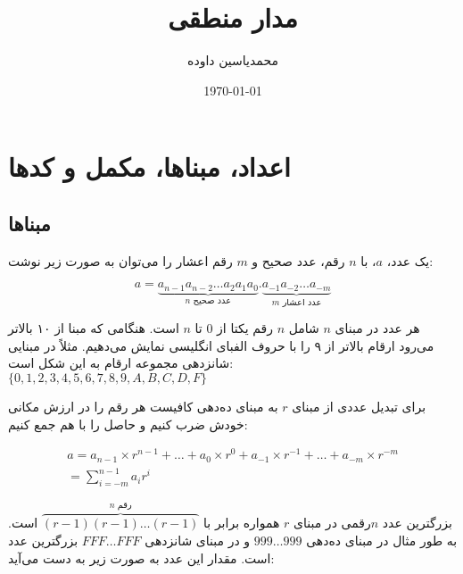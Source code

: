 \documentclass[a5paper]{article}
\author{محمدیاسین داوده}
\title{مدار منطقی}
\date{\today}
\begin{document}
\begin{titlingpage}
\maketitle


\tableofcontents
\end{titlingpage}

\section{اعداد، مبناها، مکمل و کدها}
\subsection{مبناها}
یک عدد، $a$، با $n$ رقم، عدد صحیح و $m$ رقم اعشار را می‌توان به صورت زیر نوشت:

\begin{equation}
  a = \underbrace{a_{n-1}a_{n-2} \ldots a_2a_1a_0}_{\text{$n$ عدد صحیح}}.\underbrace{a_{-1}a_{-2} \ldots a_{-m}}_{\text{$m$ عدد اعشار}}
\end{equation}

هر عدد در مبنای $n$ شامل $n$ رقم یکتا از $0$ تا $n$ است.
هنگامی که مبنا از ۱۰ بالاتر می‌رود ارقام بالاتر از ۹ را با حروف الفبای انگلیسی نمایش می‌دهیم.
مثلاً در مبنایی شانزدهی مجموعه ارقام به این شکل است:\\
$\{0,1,2,3,4,5,6,7,8,9,A,B,C,D,F\}$

برای تبدیل عددی از مبنای $r$ به مبنای ده‌دهی کافیست هر رقم را در
ارزش مکانی خودش ضرب کنیم و حاصل را با هم جمع کنیم:

\begin{equation}\begin{split}
  a = a_{n-1} \times r^{n-1} + \ldots + a_{0} \times r^{0} + a_{-1} \times r^{-1} + \ldots + a_{-m} \times r^{-m}\\
  = \sum_{i=-m}^{n-1}a_{i}r^{i}
\end{split}\end{equation}

بزرگترین عدد $n$رقمی در مبنای $r$ همواره برابر با $\overbrace{(r-1)(r-1)\ldots(r-1)}^{\text{$n$ رقم}}$ است.
به طور مثال در مبنای ده‌دهی $999\ldots999$ و در مبنای شانزدهی $FFF\ldots{}FFF$ بزرگترین عدد است.
مقدار این عدد به صورت زیر به دست می‌آید:
\end{document}
